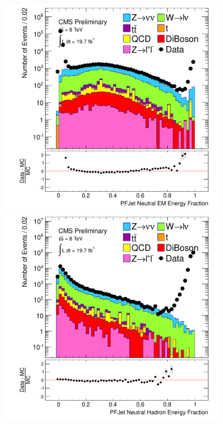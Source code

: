 \begin{figure}[!Hhtb]
\begin{center}
  \includegraphics[scale=0.31]     {Figures/sus13009/nocut/prelimLabels/PFAK5JetNeuEmEngFrac.pdf}
  \includegraphics[scale=0.31]     {Figures/sus13009/nocut/prelimLabels/PFAK5JetNeuHadEngFrac.pdf}

\end{center}
\end{figure}

